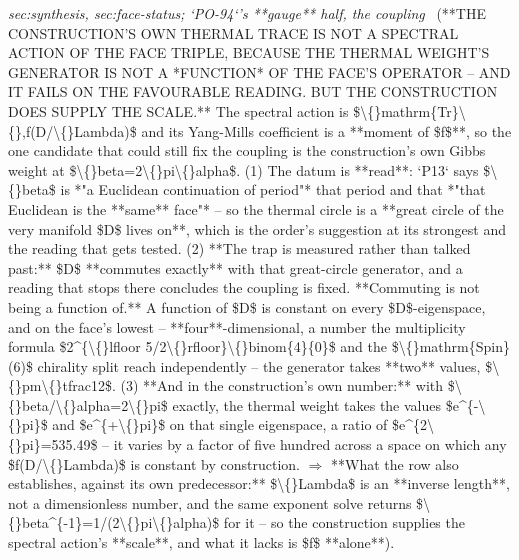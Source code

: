\begin{description}
\textit{sec:synthesis, sec:face-status; `PO-94`'s **gauge** half, the coupling} \ (**THE CONSTRUCTION'S OWN THERMAL TRACE IS NOT A SPECTRAL ACTION OF THE FACE TRIPLE, BECAUSE THE THERMAL WEIGHT'S GENERATOR IS NOT A *FUNCTION* OF THE FACE'S OPERATOR -- AND IT FAILS ON THE FAVOURABLE READING. BUT THE CONSTRUCTION DOES SUPPLY THE SCALE.** The spectral action is \$\textbackslash\{\}mathrm\{Tr\}\textbackslash\{\},f(D/\textbackslash\{\}Lambda)\$ and its Yang-Mills coefficient is a **moment of \$f\$**, so the one candidate that could still fix the coupling is the construction's own Gibbs weight at \$\textbackslash\{\}beta=2\textbackslash\{\}pi\textbackslash\{\}alpha\$. (1) The datum is **read**: `P13` says \$\textbackslash\{\}beta\$ is *"a Euclidean continuation of period"* that period and that *"that Euclidean is the **same** face"* -- so the thermal circle is a **great circle of the very manifold \$D\$ lives on**, which is the order's suggestion at its strongest and the reading that gets tested. (2) **The trap is measured rather than talked past:** \$D\$ **commutes exactly** with that great-circle generator, and a reading that stops there concludes the coupling is fixed.  **Commuting is not being a function of.** A function of \$D\$ is constant on every \$D\$-eigenspace, and on the face's lowest -- **four**-dimensional, a number the multiplicity formula \$2\textasciicircum{}\{\textbackslash\{\}lfloor 5/2\textbackslash\{\}rfloor\}\textbackslash\{\}binom\{4\}\{0\}\$ and the \$\textbackslash\{\}mathrm\{Spin\}(6)\$ chirality split reach independently -- the generator takes **two** values, \$\textbackslash\{\}pm\textbackslash\{\}tfrac12\$. (3) **And in the construction's own number:** with \$\textbackslash\{\}beta/\textbackslash\{\}alpha=2\textbackslash\{\}pi\$ exactly, the thermal weight takes the values \$e\textasciicircum{}\{-\textbackslash\{\}pi\}\$ and \$e\textasciicircum{}\{+\textbackslash\{\}pi\}\$ on that single eigenspace, a ratio of \$e\textasciicircum{}\{2\textbackslash\{\}pi\}=535.49\$ -- it varies by a factor of five hundred across a space on which any \$f(D/\textbackslash\{\}Lambda)\$ is constant by construction. \ensuremath{\Rightarrow} **What the row also establishes, against its own predecessor:** \$\textbackslash\{\}Lambda\$ is an **inverse length**, not a dimensionless number, and the same exponent solve returns \$\textbackslash\{\}beta\textasciicircum{}\{-1\}=1/(2\textbackslash\{\}pi\textbackslash\{\}alpha)\$ for it -- so the construction supplies the spectral action's **scale**, and what it lacks is \$f\$ **alone**). 

\end{description}

